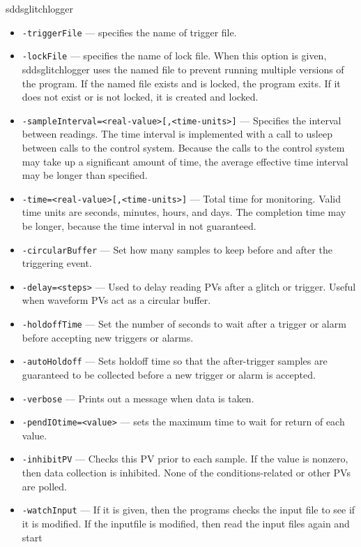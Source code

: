 \begin{sddsprog}{sddsglitchlogger}
\begin{itemize}
  \item {\tt -triggerFile} --- specifies the name of trigger file.
  \item {\tt -lockFile} --- specifies the name of lock file. When this option is given,
                sddsglitchlogger uses the named file to prevent running multiple versions of
                the program.  If the named file exists and is locked, the program exits.
                If it does not exist or is not locked, it is created and locked.
  \item {\tt -sampleInterval=<real-value>[,<time-units>]} --- Specifies the interval between readings.
                The time interval is implemented with a call to usleep between calls to the control system.
                Because the calls to the control system may take up a significant amount of time, the average
                effective time interval may be longer than specified.
  \item {\tt -time=<real-value>[,<time-units>]} --- Total time for monitoring. Valid time units are
                seconds, minutes, hours, and days. The completion time may be longer, because the time
                interval in not guaranteed.
  \item {\tt -circularBuffer} --- Set how many samples to keep before and after the triggering event.
  \item {\tt -delay=<steps>} --- Used to delay reading PVs after a glitch or trigger. Useful when
                waveform PVs act as a circular buffer.
  \item {\tt -holdoffTime} --- Set the number of seconds to wait after a trigger or alarm before
                accepting new triggers or alarms.
  \item {\tt -autoHoldoff} --- Sets holdoff time so that the after-trigger samples are guaranteed
                to be collected before a new trigger or alarm is accepted.
  \item {\tt -verbose} --- Prints out a message when data is taken.
  \item {\tt -pendIOtime=<value>} --- sets the maximum time to wait for return of each value.
  \item {\tt -inhibitPV} --- Checks this PV prior to each sample.  If the value is nonzero,
                then data collection is inhibited.  None of the conditions-related or other PVs are polled.
  \item {\tt -watchInput} --- If it is given, then the programs checks the input file to see if
                it is modified. If the inputfile is modified, then read the input files again and start

\end{itemize}
\end{sddsprog}
